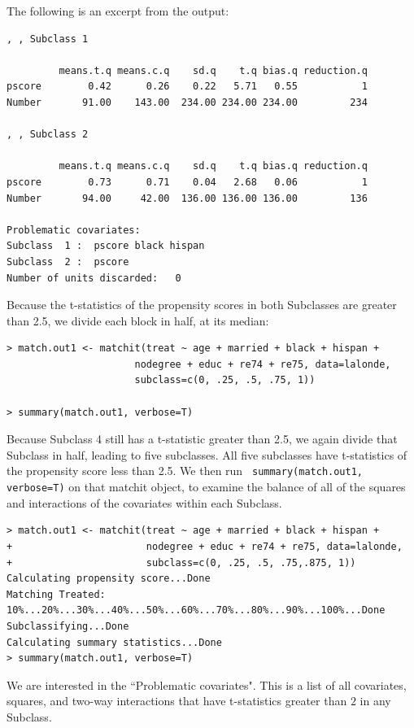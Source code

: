 \documentclass[oneside,letterpaper,titlepage]{article}
\begin{document}
The following is an excerpt from the output:

\begin{verbatim}
, , Subclass 1

         means.t.q means.c.q    sd.q    t.q bias.q reduction.q
pscore        0.42      0.26    0.22   5.71   0.55           1
Number       91.00    143.00  234.00 234.00 234.00         234

, , Subclass 2

         means.t.q means.c.q    sd.q    t.q bias.q reduction.q
pscore        0.73      0.71    0.04   2.68   0.06           1
Number       94.00     42.00  136.00 136.00 136.00         136

Problematic covariates:
Subclass  1 :  pscore black hispan
Subclass  2 :  pscore
Number of units discarded:   0

\end{verbatim}

Because the t-statistics of the propensity scores in both Subclasses are greater than 2.5, we divide each block in 
half, at its median:

\begin{verbatim}
> match.out1 <- matchit(treat ~ age + married + black + hispan +
                      nodegree + educ + re74 + re75, data=lalonde,                      
                      subclass=c(0, .25, .5, .75, 1))

> summary(match.out1, verbose=T)
\end{verbatim}

Because Subclass 4 still has a t-statistic greater than 2.5, we again divide that Subclass in half, leading to
five subclasses.  All five subclasses have t-statistics of the propensity score less than 2.5.  We then run {\tt 
summary(match.out1, verbose=T)} on that matchit object, to examine the balance of all
of the squares and interactions of the covariates within each Subclass.

\begin{verbatim}
> match.out1 <- matchit(treat ~ age + married + black + hispan +
+                       nodegree + educ + re74 + re75, data=lalonde,
+                       subclass=c(0, .25, .5, .75,.875, 1))
Calculating propensity score...Done
Matching Treated: 10%...20%...30%...40%...50%...60%...70%...80%...90%...100%...Done
Subclassifying...Done
Calculating summary statistics...Done
> summary(match.out1, verbose=T)
\end{verbatim}

We are interested in the ``Problematic covariates".  This is a list of all covariates, squares, and two-way interactions 
that have t-statistics greater than $2$ in any Subclass.
\end{document}

